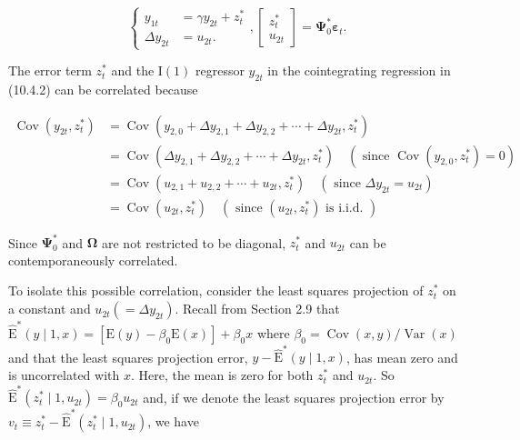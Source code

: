 \documentclass[10pt]{article}
\begin{document}
\[
\left\{\begin{array}{rl}
y_{1 t} & =\gamma y_{2 t}+z_{t}^{*}  \tag{10.4.2}\\
\Delta y_{2 t} & =u_{2 t} .
\end{array},\left[\begin{array}{c}
z_{t}^{*} \\
u_{2 t}
\end{array}\right]=\boldsymbol{\Psi}_{0}^{*} \boldsymbol{\varepsilon}_{t} .\right.
\]

The error term $z_{t}^{*}$ and the $\mathrm{I}(1)$ regressor $y_{2 t}$ in the cointegrating regression in (10.4.2) can be correlated because


\begin{align*}
\operatorname{Cov}\left(y_{2 t}, z_{t}^{*}\right) & =\operatorname{Cov}\left(y_{2,0}+\Delta y_{2,1}+\Delta y_{2,2}+\cdots+\Delta y_{2 t}, z_{t}^{*}\right) \\
& =\operatorname{Cov}\left(\Delta y_{2,1}+\Delta y_{2,2}+\cdots+\Delta y_{2 t}, z_{t}^{*}\right) \quad\left(\text { since } \operatorname{Cov}\left(y_{2,0}, z_{t}^{*}\right)=0\right) \\
& =\operatorname{Cov}\left(u_{2,1}+u_{2,2}+\cdots+u_{2 t}, z_{t}^{*}\right) \quad\left(\text { since } \Delta y_{2 t}=u_{2 t}\right) \\
& =\operatorname{Cov}\left(u_{2 t}, z_{t}^{*}\right) \quad\left(\text { since }\left(u_{2 t}, z_{t}^{*}\right) \text { is i.i.d. }\right) \tag{10.4.3}
\end{align*}


Since $\boldsymbol{\Psi}_{0}^{*}$ and $\boldsymbol{\Omega}$ are not restricted to be diagonal, $z_{t}^{*}$ and $u_{2 t}$ can be contemporaneously correlated.

To isolate this possible correlation, consider the least squares projection of $z_{t}^{*}$ on a constant and $u_{2 t}\left(=\Delta y_{2 t}\right)$. Recall from Section 2.9 that $\widehat{\mathrm{E}}^{*}(y \mid 1, x)= \left[\mathrm{E}(y)-\beta_{0} \mathrm{E}(x)\right]+\beta_{0} x$ where $\beta_{0}=\operatorname{Cov}(x, y) / \operatorname{Var}(x)$ and that the least squares projection error, $y-\widehat{\mathrm{E}}^{*}(y \mid 1, x)$, has mean zero and is uncorrelated with $x$. Here, the mean is zero for both $z_{t}^{*}$ and $u_{2 t}$. So $\widehat{\mathrm{E}}^{*}\left(z_{t}^{*} \mid 1, u_{2 t}\right)=\beta_{0} u_{2 t}$ and, if we denote the least squares projection error by $v_{t} \equiv z_{t}^{*}-\widehat{\mathrm{E}}^{*}\left(z_{t}^{*} \mid 1, u_{2 t}\right)$, we have
\end{document}
